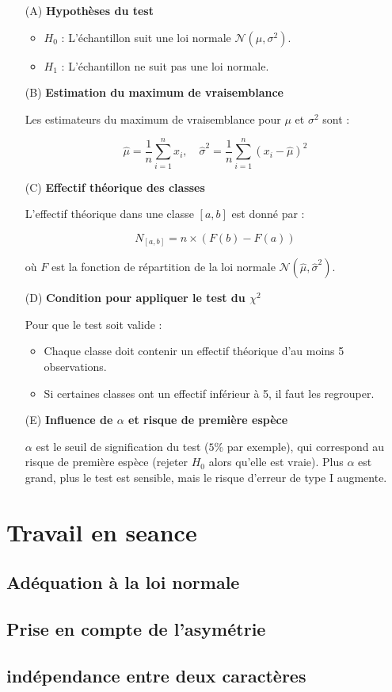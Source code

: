 \documentclass{article}
\begin{document}
\begin{enumerate}
    \item[(A)] \textbf{Hypothèses du test}
    \begin{itemize}
        \item \( H_0 \) : L’échantillon suit une loi normale \( \mathcal{N}(\mu, \sigma^2) \).
        \item \( H_1 \) : L’échantillon ne suit pas une loi normale.
    \end{itemize}
    
    \item[(B)] \textbf{Estimation du maximum de vraisemblance}
    
    Les estimateurs du maximum de vraisemblance pour \( \mu \) et \( \sigma^2 \) sont :
    
    \[
    \hat{\mu} = \frac{1}{n} \sum_{i=1}^{n} x_i, \quad
    \hat{\sigma}^2 = \frac{1}{n} \sum_{i=1}^{n} (x_i - \hat{\mu})^2
    \]

    \item[(C)] \textbf{Effectif théorique des classes}
    
    L’effectif théorique dans une classe \( [a, b] \) est donné par :
    
    \[
    N_{[a,b]} = n \times (F(b) - F(a))
    \]

    où \( F \) est la fonction de répartition de la loi normale \( \mathcal{N}(\hat{\mu}, \hat{\sigma}^2) \).

    \item[(D)] \textbf{Condition pour appliquer le test du \( \chi^2 \)}
    
    Pour que le test soit valide :
    \begin{itemize}
        \item Chaque classe doit contenir un effectif théorique d’au moins 5 observations.
        \item Si certaines classes ont un effectif inférieur à 5, il faut les regrouper.
    \end{itemize}
    
    \item[(E)] \textbf{Influence de \( \alpha \) et risque de première espèce}
    
    \( \alpha \) est le seuil de signification du test (\( 5\% \) par exemple), qui correspond au risque de première espèce (rejeter \( H_0 \) alors qu’elle est vraie). Plus \( \alpha \) est grand, plus le test est sensible, mais le risque d’erreur de type I augmente.
\end{enumerate}

\section{Travail en seance}

\subsection{Adéquation à la loi normale}

\subsection{Prise en compte de l'asymétrie}

\subsection{indépendance entre deux caractères}
\end{document}

